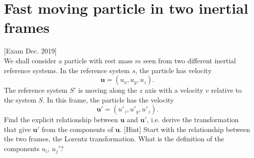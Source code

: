 \documentclass{article}
\begin{document}
    \section{Fast moving particle in two inertial frames}
    [Exam Dec. 2019] \\
    We shall consider a particle with rest mass $m$ seen from two different inertial reference systems. In the reference system $s$, the particle has velocity
    \begin{equation*}
        \mathbf{u} = (u_x, u_y, u_z).
    \end{equation*} 
    The reference system $S'$ is moving along the $z$ axis with a velocity $v$ relative to the system $S$. In this frame, the particle has the velocity
    \begin{equation*}
        \mathbf{u'} = (u'_z, u'_y, u'_z).
    \end{equation*}
    Find the explicit relationship between $\mathbf{u}$ and $\mathbf{u'}$, i.e. derive the transformation that give $\mathbf{u'}$ from the components of $\mathbf{u}$. [Hint] Start with the relationship between the two frames, the Lorentz transformation. What is the definition of the components $u_i, \, u_j'$?
\end{document}
